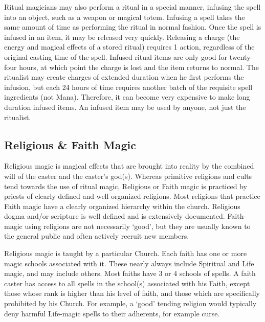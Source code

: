 \documentclass[twoside]{book}
\begin{document}
    {  
     Ritual magicians may also perform a ritual in a
               special manner, infusing the spell into an object, such as
               a weapon or magical totem. Infusing a spell takes the same
               amount of time as performing the ritual in normal fashion.
               Once the spell is infused in an item, it may be released
               very quickly. Releasing a charge (the energy and magical
               effects of a stored ritual) requires 1 action, regardless
               of the original casting time of the spell. Infused ritual
               items are only good for twenty-four hours, at which point
               the charge is lost and the item returns to normal. The
               ritualist may create charges of extended duration when he
               first performs the infusion, but each 24 hours of time
               requires another batch of the requisite spell ingredients
               (not Mana). Therefore, it can become very expensive to
               make long duration infused items. An infused item may be
               used by anyone, not just the ritualist. 
    }
  
    

\subsection{Religious \& Faith Magic}
    
    {  
     Religious magic is magical effects that are brought
               into reality by the combined will of the caster and the
               caster's god(s). Whereas primitive religions and
               cults tend towards the use of ritual magic, Religious or
               Faith magic is practiced by priests of clearly defined and
               well organized religions. Most religions that practice
               Faith magic have a clearly organized hierarchy within the
               church. Religious dogma and/or scripture is well defined
               and is extensively documented. Faith-magic using religions
               are not necessarily `good', but they are
               usually known to the general public and often actively
               recruit new members. 
    }
  
    {  
     Religious magic is taught by a particular Church.
               Each faith has one or more magic schools associated with
               it. These nearly always include Spiritual and Life magic,
               and may include others. Most faiths have 3 or 4 schools of
               spells. A faith caster has access to all spells in the
               school(s) associated with his Faith, except those whose
               rank is higher than his level of faith, and those which
               are specifically prohibited by his Church. For example, a
               `good' tending religion would typically deny
               harmful Life-magic spells to their adherents, for example
               curse. 
    }
  
\end{document}

